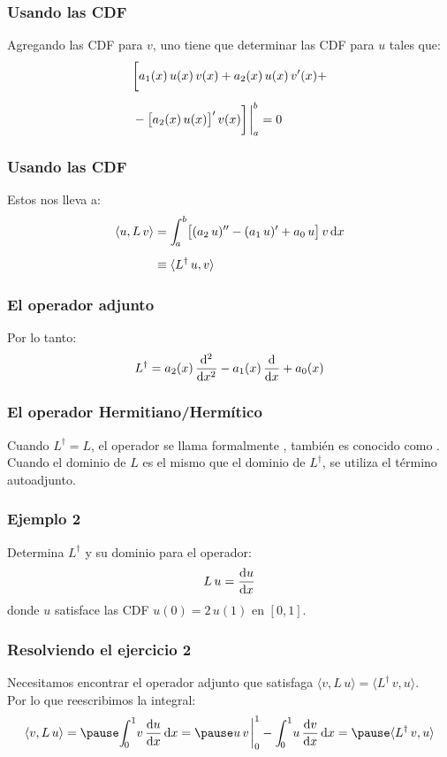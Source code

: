 \documentclass[12pt]{beamer}
\begin{document}
\begin{frame}
\frametitle{Usando las CDF}
Agregando las CDF para $v$, \pause uno tiene que determinar las CDF para $u$ tales que:
\pause
\begin{align*}
&\bigg[ a_{1}(x) \, u(x) \, v(x) + a_{2}(x) \, u(x) \, \pderivada{v}(x) + \\[0.5em]
&- \big[ a_{2}(x) \, u(x) \big]^{\prime} \, v(x) \bigg] \eval_{a}^{b} = 0
\end{align*}
\end{frame}
\begin{frame}
\frametitle{Usando las CDF}
Estos nos lleva a:
\pause
\begin{align*}
\langle u , L \, v \rangle &= \scaleint{5ex}_{\bs a}^{b}  \big[ (a_{2} \, u)^{\prime \prime} - (a_{1} \, u)^{\prime} + a_{0} \, u \big] \, v \dd{x} \\[0.5em]
&\equiv \langle L^{\dagger} \, u, v \rangle 
\end{align*}
\end{frame}
\begin{frame}
\frametitle{El operador adjunto}
Por lo tanto:
\pause
\begin{align}
L^{\dagger} = a_{2}(x) \, \dv[2]{x} - a_{1}(x) \, \dv{x} + a_{0}(x)
\label{eq:ecuacion_04_20}
\end{align}
\end{frame}
\begin{frame}
\frametitle{El operador Hermitiano/Hermítico}
Cuando $L^{\dagger} = L$, \pause el operador se llama formalmente , también es conocido como .
\\
\bigskip
\pause
Cuando el dominio de $L$ es el mismo que el dominio de $L^{\dagger}$, se utiliza el término autoadjunto.
\end{frame}
\begin{frame}
\frametitle{Ejemplo 2}
Determina $L^{\dagger}$ y su dominio para el operador:
\pause
\begin{align*}
L \, u = \dv{u}{x}
\end{align*}
donde $u$ satisface las CDF $u(0) = 2 \, u(1)$ en $[0, 1]$.
\end{frame}
\begin{frame}
\frametitle{Resolviendo el ejercicio 2}
Necesitamos encontrar el operador adjunto que satisfaga $\langle v, L \, u \rangle = \langle L^{\dagger} \, v, u \rangle$.
\\
\bigskip
\pause  
Por lo que reescribimos la integral:
\pause
\begin{eqnarray*}
\langle v, L \, u \rangle = \pause \scaleint{5ex}_{\bs 0}^{1} v \, \dv{u}{x} \dd{x} = \pause u \, v \eval_{0}^{1} - \scaleint{5ex}_{\bs 0}^{1} u \, \dv{v}{x} \dd{x} = \pause \langle L^{\dagger} \, v, u \rangle
\end{eqnarray*}
\end{frame}
\end{document}
